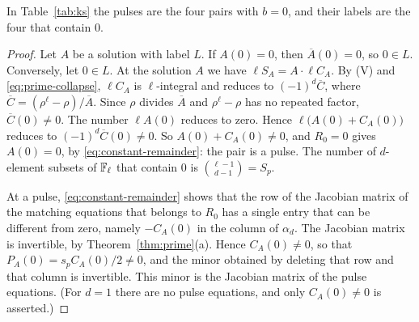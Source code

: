 In Table~\ref{tab:ks} the pulses are the four pairs with \(b=0\), and
their labels are the four that contain \(0\).

\begin{proof}
Let \(A\) be a solution with label \(L\). If \(A(0)=0\), then
\(\overline A(0)=0\), so \(0\in L\). Conversely, let \(0\in L\). At the
solution \(A\) we have \(\ell S_A=A\cdot\ell C_A\). By \textup{(V)} and
\eqref{eq:prime-collapse}, \(\ell C_A\) is \(\ell\)-integral and reduces
to \((-1)^d\overline C\), where
\(\overline C=(\rho^\ell-\rho)/\overline A\). Since \(\rho\) divides
\(\overline A\) and \(\rho^\ell-\rho\) has no repeated factor,
\(\overline C(0)\ne0\). The number \(\ell A(0)\) reduces to zero. Hence
\(\ell\bigl(A(0)+C_A(0)\bigr)\) reduces to \((-1)^d\overline C(0)\ne0\).
So \(A(0)+C_A(0)\ne0\), and \(R_0=0\) gives \(A(0)=0\), by
\eqref{eq:constant-remainder}: the pair is a pulse. The number of
\(d\)-element subsets of \(\mathbb F_\ell\) that contain \(0\) is
\(\binom{\ell-1}{d-1}=S_p\).

At a pulse, \eqref{eq:constant-remainder} shows that the row of the
Jacobian matrix of the matching equations that belongs to \(R_0\) has a
single entry that can be different from zero, namely \(-C_A(0)\) in the
column of \(\alpha_d\). The Jacobian matrix is invertible, by
Theorem~\ref{thm:prime}(a). Hence \(C_A(0)\ne0\), so that
\(P_A(0)=s_pC_A(0)/2\ne0\), and the minor obtained by deleting that row
and that column is invertible. This minor is the Jacobian matrix of the
pulse equations. (For \(d=1\) there are no pulse equations, and only
\(C_A(0)\ne0\) is asserted.)
\end{proof}
